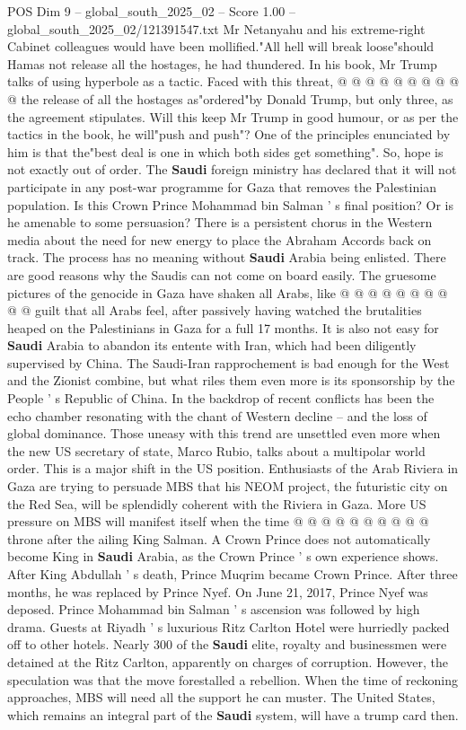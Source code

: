 \begin{textsample}{POS Dim 9 – global\_south\_2025\_02 – Score 1.00 – global\_south\_2025\_02/121391547.txt}
Mr Netanyahu and his extreme-right Cabinet colleagues would have been mollified."All hell will break loose"should Hamas not release all the hostages, he had thundered.
In his book, Mr Trump talks of using hyperbole as a tactic.
Faced with this threat, @ @ @ @ @ @ @ @ @ @ the release of all the hostages as"ordered"by Donald Trump, but only three, as the agreement stipulates.
Will this keep Mr Trump in good humour, or as per the tactics in the book, he will"push and push"?
One of the principles enunciated by him is that the"best deal is one in which both sides get something".
So, hope is not exactly out of order.
The \textbf{Saudi} foreign ministry has declared that it will not participate in any post-war programme for Gaza that removes the Palestinian population.
Is this Crown Prince Mohammad bin Salman ' s final position?
Or is he amenable to some persuasion?
There is a persistent chorus in the Western media about the need for new energy to place the Abraham Accords back on track.
The process has no meaning without \textbf{Saudi} Arabia being enlisted.
There are good reasons why the Saudis can not come on board easily.
The gruesome pictures of the genocide in Gaza have shaken all Arabs, like @ @ @ @ @ @ @ @ @ @ guilt that all Arabs feel, after passively having watched the brutalities heaped on the Palestinians in Gaza for a full 17 months.
It is also not easy for \textbf{Saudi} Arabia to abandon its entente with Iran, which had been diligently supervised by China.
The Saudi-Iran rapprochement is bad enough for the West and the Zionist combine, but what riles them even more is its sponsorship by the People ' s Republic of China.
In the backdrop of recent conflicts has been the echo chamber resonating with the chant of Western decline -- and the loss of global dominance.
Those uneasy with this trend are unsettled even more when the new US secretary of state, Marco Rubio, talks about a multipolar world order.
This is a major shift in the US position.
Enthusiasts of the Arab Riviera in Gaza are trying to persuade MBS that his NEOM project, the futuristic city on the Red Sea, will be splendidly coherent with the Riviera in Gaza.
More US pressure on MBS will manifest itself when the time @ @ @ @ @ @ @ @ @ @ throne after the ailing King Salman.
A Crown Prince does not automatically become King in \textbf{Saudi} Arabia, as the Crown Prince ' s own experience shows.
After King Abdullah ' s death, Prince Muqrim became Crown Prince.
After three months, he was replaced by Prince Nyef.
On June 21, 2017, Prince Nyef was deposed.
Prince Mohammad bin Salman ' s ascension was followed by high drama.
Guests at Riyadh ' s luxurious Ritz Carlton Hotel were hurriedly packed off to other hotels.
Nearly 300 of the \textbf{Saudi} elite, royalty and businessmen were detained at the Ritz Carlton, apparently on charges of corruption.
However, the speculation was that the move forestalled a rebellion.
When the time of reckoning approaches, MBS will need all the support he can muster.
The United States, which remains an integral part of the \textbf{Saudi} system, will have a trump card then.

\end{textsample}
